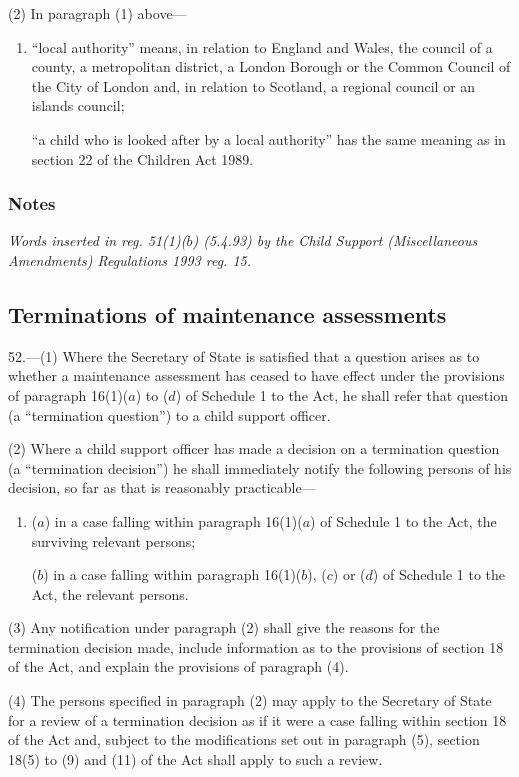\documentclass[a4paper]{article}
\newcommand\amendment[1]{\subsubsection*{Notes}{\itshape\frenchspacing\footnotesize #1 \par}}
\begin{document}
(2) In paragraph (1) above—
\begin{enumerate}\item[]
“local authority” means, in relation to England and Wales, the council of a county, a metropolitan district, a London Borough or the Common Council of the City of London and, in relation to Scotland, a regional council or an islands council;

“a child who is looked after by a local authority” has the same meaning as in section 22 of the Children Act 1989.
\end{enumerate}

\amendment{
Words inserted in reg. 51(1)($b$) (5.4.93) by the Child Support (Miscellaneous Amendments) Regulations 1993 reg. 15.
}

\subsection[52. Terminations of maintenance assessments]{Terminations of maintenance assessments}

52.—(1) Where the Secretary of State is satisfied that a question arises as to whether a maintenance assessment has ceased to have effect under the provisions of paragraph 16(1)($a$) to ($d$) of Schedule 1 to the Act, he shall refer that question (a “termination question”) to a child support officer.

(2) Where a child support officer has made a decision on a termination question (a “termination decision”) he shall immediately notify the following persons of his decision, so far as that is reasonably practicable—
\begin{enumerate}\item[]
($a$) in a case falling within paragraph 16(1)($a$) of Schedule 1 to the Act, the surviving relevant persons;

($b$) in a case falling within paragraph 16(1)($b$), ($c$) or ($d$) of Schedule 1 to the Act, the relevant persons.
\end{enumerate}

(3) Any notification under paragraph (2) shall give the reasons for the termination decision made, include information as to the provisions of section 18 of the Act, and explain the provisions of paragraph (4).

(4) The persons specified in paragraph (2) may apply to the Secretary of State for a review of a termination decision as if it were a case falling within section 18 of the Act and, subject to the modifications set out in paragraph (5), section 18(5) to (9) and (11) of the Act shall apply to such a review.
\end{document}
